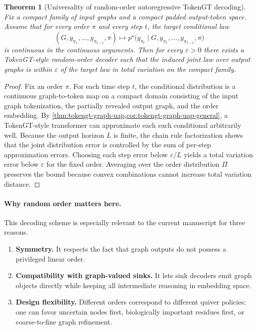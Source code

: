\documentclass[11pt]{article}
\theoremstyle{definition}
\theoremstyle{plain}
\newtheorem{theorem}{Theorem}[section]
\theoremstyle{remark}
\begin{document}
\begin{theorem}[Universality of random-order autoregressive TokenGT decoding]
\label{thm:random-order-universality}
Fix a compact family of input graphs and a compact padded output-token space.
Assume that for every order $\pi$ and every step $t$, the target conditional law
\[
(G, y_{\pi_1},\dots,y_{\pi_{t-1}}, \pi) \mapsto
p^\star\!\bigl(y_{\pi_t}\mid G,y_{\pi_1},\dots,y_{\pi_{t-1}},\pi\bigr)
\]
is continuous in the continuous arguments.
Then for every $\varepsilon>0$ there exists a TokenGT-style random-order decoder such that the induced joint law over output graphs is within $\varepsilon$ of the target law in total variation on the compact family.
\end{theorem}

\begin{proof}
Fix an order $\pi$.
For each time step $t$, the conditional distribution is a continuous graph-to-token map on a compact domain consisting of the input graph tokenization, the partially revealed output graph, and the order embedding.
By \cref{thm:tokengt-graph-uap,cor:tokengt-graph-uap-general}, a TokenGT-style transformer can approximate each such conditional arbitrarily well.
Because the output horizon $L$ is finite, the chain rule factorization shows that the joint distribution error is controlled by the sum of per-step approximation errors.
Choosing each step error below $\varepsilon/L$ yields a total variation error below $\varepsilon$ for the fixed order.
Averaging over the order distribution $\Pi$ preserves the bound because convex combinations cannot increase total variation distance.
\end{proof}

\paragraph{Why random order matters here.}
This decoding scheme is especially relevant to the current manuscript for three reasons.
\begin{enumerate}[leftmargin=2em]
\item \textbf{Symmetry.} It respects the fact that graph outputs do not possess a privileged linear order.
\item \textbf{Compatibility with graph-valued sinks.} It lets sink decoders emit graph objects directly while keeping all intermediate reasoning in embedding space.
\item \textbf{Design flexibility.} Different orders correspond to different quiver policies; one can favor uncertain nodes first, biologically important residues first, or coarse-to-fine graph refinement.
\end{enumerate}
\end{document}
